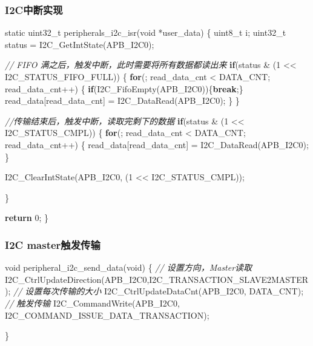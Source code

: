 \documentclass[
  12pt,
]{book}
\newenvironment{Shaded}{\begin{snugshade}}{\end{snugshade}}
\newcommand{\CommentTok}[1]{\textcolor[rgb]{0.56,0.35,0.01}{\textit{#1}}}
\newcommand{\ControlFlowTok}[1]{\textcolor[rgb]{0.13,0.29,0.53}{\textbf{#1}}}
\newcommand{\DataTypeTok}[1]{\textcolor[rgb]{0.13,0.29,0.53}{#1}}
\newcommand{\DecValTok}[1]{\textcolor[rgb]{0.00,0.00,0.81}{#1}}
\newcommand{\NormalTok}[1]{#1}
\begin{document}
\hypertarget{i2cux4e2dux65adux5b9eux73b0}{%
\subsubsection{I2C中断实现}\label{i2cux4e2dux65adux5b9eux73b0}}

\begin{Shaded}
\begin{Highlighting}[]
\DataTypeTok{static} \DataTypeTok{uint32_t}\NormalTok{ peripherals_i2c_isr(}\DataTypeTok{void}\NormalTok{ *user_data)}
\NormalTok{\{}
  \DataTypeTok{uint8_t}\NormalTok{ i;}
  \DataTypeTok{uint32_t}\NormalTok{ status = I2C_GetIntState(APB_I2C0);}
  
  \CommentTok{// FIFO 满之后，触发中断，此时需要将所有数据都读出来}
  \ControlFlowTok{if}\NormalTok{(status & (}\DecValTok{1}\NormalTok{ << I2C_STATUS_FIFO_FULL))}
\NormalTok{  \{}
    \ControlFlowTok{for}\NormalTok{(; read_data_cnt < DATA_CNT; read_data_cnt++)}
\NormalTok{    \{}
      \ControlFlowTok{if}\NormalTok{(I2C_FifoEmpty(APB_I2C0))\{}\ControlFlowTok{break}\NormalTok{;\}}
\NormalTok{      read_data[read_data_cnt] = I2C_DataRead(APB_I2C0);}
\NormalTok{    \}}
\NormalTok{  \}}
  
  \CommentTok{//传输结束后，触发中断，读取完剩下的数据}
  \ControlFlowTok{if}\NormalTok{(status & (}\DecValTok{1}\NormalTok{ << I2C_STATUS_CMPL))}
\NormalTok{  \{}
    \ControlFlowTok{for}\NormalTok{(; read_data_cnt < DATA_CNT; read_data_cnt++)}
\NormalTok{    \{}
\NormalTok{      read_data[read_data_cnt] = I2C_DataRead(APB_I2C0);}
\NormalTok{    \}}

\NormalTok{    I2C_ClearIntState(APB_I2C0, (}\DecValTok{1}\NormalTok{ << I2C_STATUS_CMPL));}
    
\NormalTok{  \}}
  
  \ControlFlowTok{return} \DecValTok{0}\NormalTok{;}
\NormalTok{\}}
\end{Highlighting}
\end{Shaded}

\hypertarget{i2c-masterux89e6ux53d1ux4f20ux8f93}{%
\subsubsection{I2C master触发传输}\label{i2c-masterux89e6ux53d1ux4f20ux8f93}}

\begin{Shaded}
\begin{Highlighting}[]
\DataTypeTok{void}\NormalTok{ peripheral_i2c_send_data(}\DataTypeTok{void}\NormalTok{)}
\NormalTok{\{}
  \CommentTok{// 设置方向，Master读取}
\NormalTok{  I2C_CtrlUpdateDirection(APB_I2C0,I2C_TRANSACTION_SLAVE2MASTER);}
  \CommentTok{// 设置每次传输的大小}
\NormalTok{  I2C_CtrlUpdateDataCnt(APB_I2C0, DATA_CNT);}
  \CommentTok{// 触发传输}
\NormalTok{  I2C_CommandWrite(APB_I2C0, I2C_COMMAND_ISSUE_DATA_TRANSACTION);}
  
\NormalTok{\}}
\end{Highlighting}
\end{Shaded}
\end{document}
